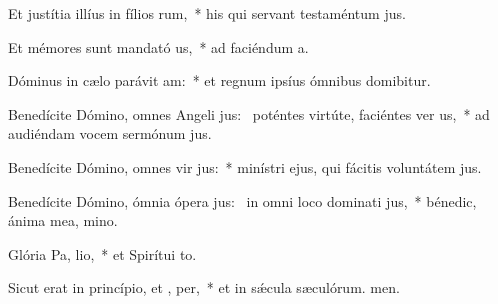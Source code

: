 \item Et justítia illíus in fílios rum,~* his qui servant testaméntum jus.
\item Et mémores sunt mandató us,~* ad faciéndum a.
\item Dóminus in cælo parávit  am:~* et regnum ipsíus ómnibus domibitur.
\item Benedícite Dómino, omnes Angeli jus:~\pscross{} poténtes virtúte, faciéntes ver us,~* ad audiéndam vocem sermónum jus.
\item Benedícite Dómino, omnes vir jus:~* minístri ejus, qui fácitis voluntátem jus.
\item Benedícite Dómino, ómnia ópera jus:~\pscross{} in omni loco dominati jus,~* bénedic, ánima mea, mino.
\item Glória Pa,  lio,~* et Spirítui to.
\item Sicut erat in princípio, et ,  per,~* et in sǽcula sæculórum. men.
